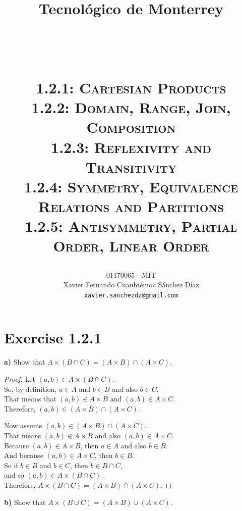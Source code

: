 \documentclass[titlepage, letterpaper, fleqn]{article}
\title{
\vspace{1in}
\textbf{Tecnológico de Monterrey} \\
\vspace{0.5in}
\textmd{\mahclass} \\
\large{\textit{\mahteacher}} \\
\vspace{0.5in}
\textsc{\mahtitle}\\
\textsc{1.2.1: Cartesian Products}\\
\textsc{1.2.2: Domain, Range, Join, Composition}\\
\textsc{1.2.3: Reflexivity and Transitivity}\\
\textsc{1.2.4: Symmetry, Equivalence Relations and Partitions}\\
\textsc{1.2.5: Antisymmetry, Partial Order, Linear Order}\\
\author{01170065  - MIT \\
Xavier Fernando Cuauhtémoc Sánchez Díaz \\
\texttt{xavier.sanchezdz@gmail.com}}
\date{\mahdate}
}
\newcommand{\spacepls}{\vspace{5mm}}
\begin{document}
\begin{titlepage}
\maketitle
\end{titlepage}

%
%

\section{Exercise 1.2.1}

{\large \textbf{a)} Show that \(A \times (B \cap C) = (A \times B) \cap (A \times C)\).}

\begin{proof}
Let \((a,b) \in A \times (B \cap C)\).\\
So, by definition, \(a \in A\) and \(b \in B\) and also \(b \in C\).\\
That means that \((a,b) \in A \times B\) and \((a,b) \in A \times C\).\\
Therefore, \((a,b) \in (A \times B) \cap (A \times C)\).

\spacepls

Now assume \((a,b) \in (A \times B) \cap (A \times C)\).\\
That means \((a,b) \in A \times B\) and also \((a,b) \in A \times C\).\\
Because \((a,b) \in A \times B\), then \(a \in A\) and also \(b \in B\).\\
And because \((a,b) \in A \times C\), then \(b \in B\).\\
So if \(b \in B\) and \(b \in C\), then \(b \in B \cap C\),\\
and so \((a,b) \in A \times (B \cap C)\).\\
Therefore, \(A \times (B \cap C) = (A \times B) \cap (A \times C)\).
\end{proof}

\spacepls

{\large \textbf{b)} Show that \(A \times (B \cup C) = (A \times B) \cup (A \times C)\).}
\end{document}
